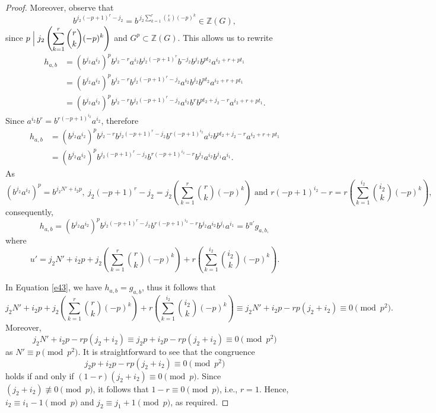 \documentclass[10pt,a4paper]{amsart}
\begin{document}
\begin{proof}
Moreover, observe that
\[
b^{j_2(-p+1)^r - j_2} = b^{\, j_2 \displaystyle\sum_{k=1}^{r}\binom{r}{k}(-p)^k} \in \mathbb{Z}(G),
\]
since $ p \Bigm| j_2 \left(\displaystyle\sum_{k=1}^{r}\binom{r}{k}(-p)^k\right)$ and $ G^{p} \subset \mathbb{Z}(G)$.
This allows us to rewrite
\[
\begin{aligned}
h_{a,b}
&= (b^{j_2}a^{i_2})^{p} b^{j_2-r} a^{i_2} b^{j_2(-p+1)^{r}} b^{-j_2}b^{j_2}b^{pt_2} a^{i_2+r+pt_1} \\
&= (b^{j_2}a^{i_2})^{p} b^{j_2-r} b^{j_2(-p+1)^r - j_2} a^{i_2} b^{j_2} b^{pt_2} a^{i_2+r+pt_1} \\
&= (b^{j_2}a^{i_2})^{p} b^{j_2-r} b^{j_2(-p+1)^r - j_2} a^{i_2} b^{r} b^{pt_2 + j_2 - r} a^{i_2+r+pt_1}.
\end{aligned}
\]
Since \( a^{i_2}b^{r} = b^{r(-p+1)^{i_2}}a^{i_2} \), therefore
\[
\begin{aligned}
h_{a,b}
&= (b^{j_2}a^{i_2})^{p} b^{j_2-r} b^{j_2(-p+1)^r - j_2} b^{r(-p+1)^{i_2}} a^{i_2} b^{pt_2 + j_2 - r} a^{i_2+r+pt_1} \\
&= (b^{j_2}a^{i_2})^{p} b^{j_2(-p+1)^r - j_2} b^{r(-p+1)^{i_2} - r} b^{j_2} a^{i_2} b^{j_1} a^{i_1}.
\end{aligned}
\]
As $$(b^{j_2}a^{i_2})^{p}=b^{j_2N'+i_2p},~ j_2(-p+1)^r-j_2 =j_2 \left(\sum_{k=1}^{r} \binom{r}{k}(-p)^k\right) \text{ and } r(-p+1)^{i_2}-r=r\left(\sum_{k=1}^{i_2}\binom{i_2}{k}(-p)^k\right),$$
consequently,
\[
h_{a,b}={(b^{j_2}a^{i_2})^{p}b^{j_2(-p+1)^r-j_2}b^{r(-p+1)^{i_2}-r}b^{j_2}a^{i_2}b^{j_1}a^{i_1}}=b^{u'}g_{a,b,}
\]
where 
\[
u'=j_2N'+i_2p+j_2\left(\displaystyle\sum_{k=1}^{r}\binom{r}{k}(-p)^k\right)+r\left(\displaystyle\sum_{k=1}^{i_2}\binom{i_2}{k}(-p)^k\right).
\]


In Equation \eqref{e43}, we have $h_{a,b}=g_{a,b}$, thus it follows that 
\[j_2N'+i_2p+j_2 \left(\sum_{k=1}^{r}\binom{r}{k}(-p)^k\right)+r\left(\sum_{k=1}^{i_2}\binom{i_2}{k}(-p)^k\right) \equiv j_2N'+i_2p-rp(j_2+i_2) \equiv 0 \pmod {p^2}.\] 
Moreover, $$j_2N'+i_2p-rp(j_2+i_2) \equiv j_2p+i_2p-rp(j_2+i_2) \equiv 0 \pmod {p^2}$$ 
as $N' \equiv p \pmod {p^2}.$
It is straightforward to see that the congruence
\[
j_2p + i_2p - rp(j_2 + i_2) \equiv 0 \pmod{p^2}
\]
holds if and only if
$
(1 - r)(j_2 + i_2) \equiv 0 \pmod{p}.
$
Since \( (j_2 + i_2) \not\equiv 0 \pmod{p} \), it follows that \( 1 - r \equiv 0 \pmod{p} \), i.e., \( r = 1 \).
Hence, \( i_2 \equiv i_1 - 1 \pmod{p} \) and \( j_2 \equiv j_1 + 1 \pmod{p} \), as required.
 


\end{proof}
\end{document}
